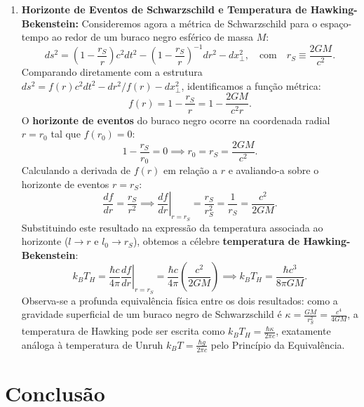 \documentclass[11pt, a4paper]{article}
\begin{document}
\begin{enumerate}[label=\alph*)]
    \item \textbf{Horizonte de Eventos de Schwarzschild e Temperatura de Hawking-Bekenstein:} Consideremos agora a métrica de Schwarzschild para o espaço-tempo ao redor de um buraco negro esférico de massa $M$:
    \begin{equation}
    ds^2 = \left( 1 - \frac{r_S}{r} \right) c^2 dt^2 - \left( 1 - \frac{r_S}{r} \right)^{-1} dr^2 - dx_\perp^2, \quad \text{com} \quad r_S \equiv \frac{2GM}{c^2}.
    \end{equation}
    Comparando diretamente com a estrutura $ds^2 = f(r) c^2 dt^2 - dr^2/f(r) - dx_\perp^2$, identificamos a função métrica:
    \begin{equation}
    f(r) = 1 - \frac{r_S}{r} = 1 - \frac{2GM}{c^2 r}.
    \end{equation}
    O \textbf{horizonte de eventos} do buraco negro ocorre na coordenada radial $r = r_0$ tal que $f(r_0) = 0$:
    \begin{equation}
    1 - \frac{r_S}{r_0} = 0 \implies r_0 = r_S = \frac{2GM}{c^2}.
    \end{equation}
    Calculando a derivada de $f(r)$ em relação a $r$ e avaliando-a sobre o horizonte de eventos $r = r_S$:
    \begin{equation}
    \frac{df}{dr} = \frac{r_S}{r^2} \implies \left. \frac{df}{dr} \right|_{r=r_S} = \frac{r_S}{r_S^2} = \frac{1}{r_S} = \frac{c^2}{2GM}.
    \end{equation}
    Substituindo este resultado na expressão da temperatura associada ao horizonte ($l \to r$ e $l_0 \to r_S$), obtemos a célebre \textbf{temperatura de Hawking-Bekenstein}:
    \begin{equation}
    k_B T_H = \frac{\hbar c}{4\pi} \left. \frac{df}{dr} \right|_{r=r_S} = \frac{\hbar c}{4\pi} \left( \frac{c^2}{2GM} \right) \implies k_B T_H = \frac{\hbar c^3}{8\pi G M}.
    \end{equation}
    Observa-se a profunda equivalência física entre os dois resultados: como a gravidade superficial de um buraco negro de Schwarzschild é $\kappa = \frac{GM}{r_S^2} = \frac{c^4}{4GM}$, a temperatura de Hawking pode ser escrita como $k_B T_H = \frac{\hbar \kappa}{2\pi c}$, exatamente análoga à temperatura de Unruh $k_B T = \frac{\hbar g}{2\pi c}$ pelo Princípio da Equivalência.
\end{enumerate}

\section{Conclusão}
\end{document}
